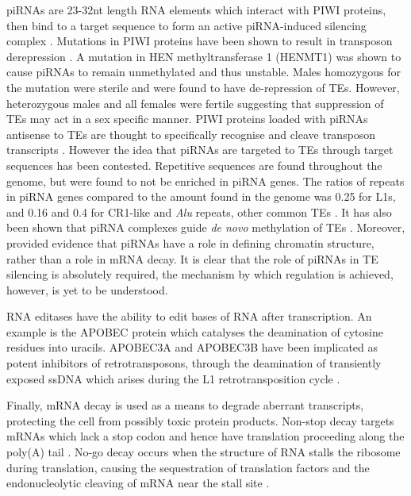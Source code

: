 \documentclass[12pt]{article}
\begin{document}
			piRNAs are 23-32nt length RNA elements which interact with PIWI proteins, then bind to a target sequence to form an active piRNA-induced silencing complex \citep{Castaneda11, Siomi11, Bodak14, Lim15}.
			Mutations in PIWI proteins have been shown to result in transposon derepression \citep{Kalmykova05,Vagin04}.
			A mutation in HEN methyltransferase 1 (HENMT1) was shown to cause piRNAs to remain unmethylated and thus unstable.
			Males homozygous for the mutation were sterile  and were found to have de-repression of TEs. 
			However, heterozygous males and all females were fertile \citep{Lim15} suggesting that suppression of TEs may act in a sex specific manner. 
			PIWI proteins loaded with piRNAs antisense to TEs are thought to specifically recognise and cleave transposon transcripts \citep{Brennecke07,Gunawardane07}. 
			However the idea that piRNAs are targeted to TEs through target sequences has been contested.
			Repetitive sequences are found throughout the genome, but were found to not be enriched in piRNA genes.
			The ratios of repeats in piRNA genes compared to the amount found in the genome was 0.25 for L1s, and 0.16 and 0.4 for CR1-like and \textit{Alu} repeats, other common TEs \citep{Williams15}.
			It has also been shown that piRNA complexes guide \textit{de novo} methylation of TEs \citep{Aravin07,Kuramochi08}.
			Moreover, \citet{Lim15} provided evidence that piRNAs have a role in defining chromatin structure, rather than a role in mRNA decay. 
			It is clear that the role of piRNAs in TE silencing is absolutely required, the mechanism by which regulation is achieved, however, is yet to be understood.
			
			RNA editases have the ability to edit bases of RNA after transcription. 
			An example is the APOBEC protein which catalyses the deamination of cytosine residues into uracils.
			APOBEC3A and APOBEC3B have been implicated as potent inhibitors of retrotransposons, through the deamination of transiently exposed ssDNA which arises during the L1 retrotransposition cycle \citep{Bogerd06, Richardson14}. 
			
			Finally, mRNA decay is used as a means to degrade aberrant transcripts, protecting the cell from possibly toxic protein products.
			Non-stop decay targets mRNAs which lack a stop codon and hence have translation proceeding along the poly(A) tail \citep{Hoof02}.
			No-go decay occurs when the structure of RNA stalls the ribosome during translation, causing the sequestration of translation factors and the endonucleolytic cleaving of mRNA near the stall site \citep{Doma06}. 
			
\end{document}
